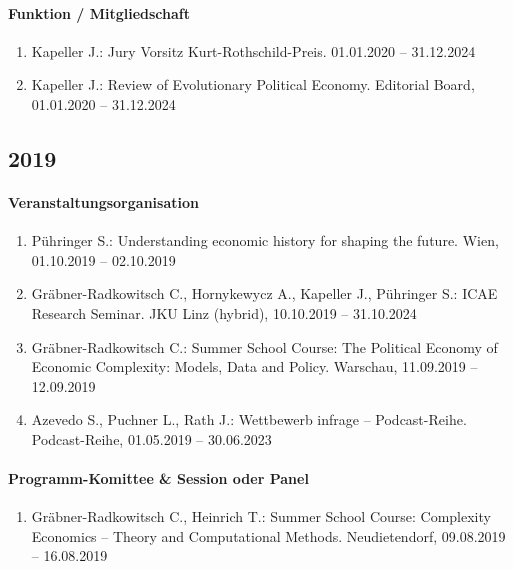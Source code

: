 \paragraph{Funktion / Mitgliedschaft}
\begin{enumerate}[leftmargin=*, labelsep=0.5cm]
\item Kapeller J.: Jury Vorsitz Kurt-Rothschild-Preis. 01.01.2020 -- 31.12.2024
\item Kapeller J.: Review of Evolutionary Political Economy. Editorial Board, 01.01.2020 -- 31.12.2024
\end{enumerate}
\subsection*{2019}
\paragraph{Veranstaltungsorganisation}
\begin{enumerate}[leftmargin=*, labelsep=0.5cm]
\item Pühringer S.: Understanding economic history for shaping the future. Wien, 01.10.2019 -- 02.10.2019
\item Gräbner-Radkowitsch C., Hornykewycz A., Kapeller J., Pühringer S.: ICAE Research Seminar. JKU Linz (hybrid), 10.10.2019 -- 31.10.2024
\item Gräbner-Radkowitsch C.: Summer School Course: The Political Economy of Economic Complexity: Models, Data and Policy. Warschau, 11.09.2019 -- 12.09.2019
\item Azevedo S., Puchner L., Rath J.: Wettbewerb infrage -- Podcast-Reihe. Podcast-Reihe, 01.05.2019 -- 30.06.2023
\end{enumerate}

\paragraph{Programm-Komittee \& Session oder Panel}
\begin{enumerate}[leftmargin=*, labelsep=0.5cm]
\item Gräbner-Radkowitsch C., Heinrich T.: Summer School Course: Complexity Economics -- Theory and Computational Methods. Neudietendorf, 09.08.2019 -- 16.08.2019
\end{enumerate}

